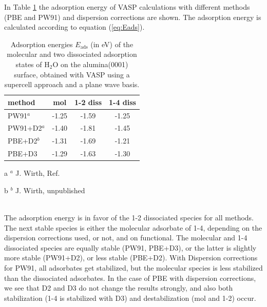 \documentclass[11pt,DIV=13,BCOR=5mm,a4paper,headinclude]{scrbook}
\begin{document}
In Table \ref{tab:vasp-results} the adsorption energy of VASP calculations with different methods (PBE and PW91) and dispersion corrections are shown.
The adsorption energy is calculated according to equation (\ref{eq:Eads}).
\begin{table}[!h]
  \centering
   \caption{Adsorption energies $E_\textrm{ads}$ (in eV) of the molecular and two dissociated adsorption states of H$_2$O on the alumina(0001) surface, obtained with VASP using a supercell approach and a plane wave basis.}
  \begin{tabular}{l|ccc}%
  \toprule
  method & mol & 1-2 diss & 1-4 diss\\\midrule %
  PW91$^a$   &-1.25 &-1.59 &-1.25 \\%
  PW91+D2$^a$&-1.40 &-1.81 &-1.45 \\%
  PBE+D2$^b$ & -1.31 & -1.69 & -1.21 \\
  PBE+D3 &-1.29&-1.63 &-1.30 \\\bottomrule%
  \end{tabular}
    \begin{tablenotes}
 \footnotesize
\item[a] $^a$ J. Wirth, Ref. \cite{WirthJPCC2012,Wirth2014thesis}
\item[b] $^b$ J. Wirth, unpublished
\end{tablenotes}
  \label{tab:vasp-results}
 \end{table}
\\

The adsorption energy is in favor of the 1-2 dissociated species for all methods.
The next stable species is either the molecular adsorbate of 1-4, depending on the dispersion corrections used, or not, and on functional.
The molecular and 1-4 dissociated species are equally stable (PW91, PBE+D3), or the latter is slightly more stable (PW91+D2), or less stable (PBE+D2).
With Dispersion corrections for PW91, all adsorbates get stabilized, but the molecular species is less stabilized than the dissociated adsorbates.
In the case of PBE with dispersion corrections, we see that D2 and D3 do not change the results strongly, and also both stabilization (1-4 is stabilized with D3) and destabilization (mol and 1-2) occur.
\end{document}
